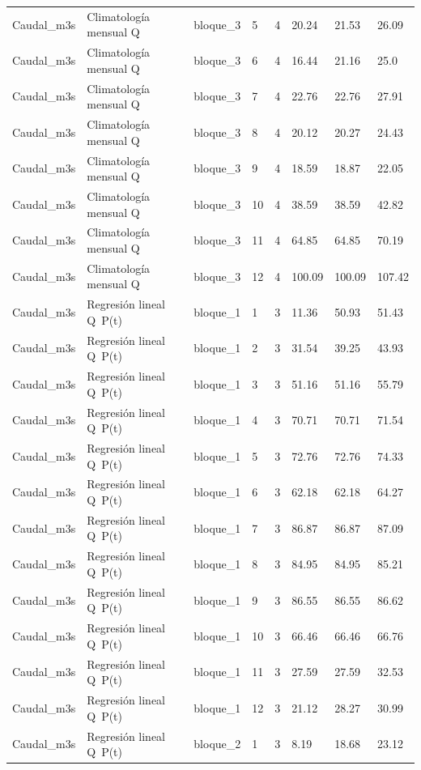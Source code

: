 \begin{longtable}{llllllll}
Caudal\_m3s & Climatología mensual Q & bloque\_3 & 5 & 4 & 20.24 & 21.53 & 26.09 \\
Caudal\_m3s & Climatología mensual Q & bloque\_3 & 6 & 4 & 16.44 & 21.16 & 25.0 \\
Caudal\_m3s & Climatología mensual Q & bloque\_3 & 7 & 4 & 22.76 & 22.76 & 27.91 \\
Caudal\_m3s & Climatología mensual Q & bloque\_3 & 8 & 4 & 20.12 & 20.27 & 24.43 \\
Caudal\_m3s & Climatología mensual Q & bloque\_3 & 9 & 4 & 18.59 & 18.87 & 22.05 \\
Caudal\_m3s & Climatología mensual Q & bloque\_3 & 10 & 4 & 38.59 & 38.59 & 42.82 \\
Caudal\_m3s & Climatología mensual Q & bloque\_3 & 11 & 4 & 64.85 & 64.85 & 70.19 \\
Caudal\_m3s & Climatología mensual Q & bloque\_3 & 12 & 4 & 100.09 & 100.09 & 107.42 \\
Caudal\_m3s & Regresión lineal Q~P(t) & bloque\_1 & 1 & 3 & 11.36 & 50.93 & 51.43 \\
Caudal\_m3s & Regresión lineal Q~P(t) & bloque\_1 & 2 & 3 & 31.54 & 39.25 & 43.93 \\
Caudal\_m3s & Regresión lineal Q~P(t) & bloque\_1 & 3 & 3 & 51.16 & 51.16 & 55.79 \\
Caudal\_m3s & Regresión lineal Q~P(t) & bloque\_1 & 4 & 3 & 70.71 & 70.71 & 71.54 \\
Caudal\_m3s & Regresión lineal Q~P(t) & bloque\_1 & 5 & 3 & 72.76 & 72.76 & 74.33 \\
Caudal\_m3s & Regresión lineal Q~P(t) & bloque\_1 & 6 & 3 & 62.18 & 62.18 & 64.27 \\
Caudal\_m3s & Regresión lineal Q~P(t) & bloque\_1 & 7 & 3 & 86.87 & 86.87 & 87.09 \\
Caudal\_m3s & Regresión lineal Q~P(t) & bloque\_1 & 8 & 3 & 84.95 & 84.95 & 85.21 \\
Caudal\_m3s & Regresión lineal Q~P(t) & bloque\_1 & 9 & 3 & 86.55 & 86.55 & 86.62 \\
Caudal\_m3s & Regresión lineal Q~P(t) & bloque\_1 & 10 & 3 & 66.46 & 66.46 & 66.76 \\
Caudal\_m3s & Regresión lineal Q~P(t) & bloque\_1 & 11 & 3 & 27.59 & 27.59 & 32.53 \\
Caudal\_m3s & Regresión lineal Q~P(t) & bloque\_1 & 12 & 3 & 21.12 & 28.27 & 30.99 \\
Caudal\_m3s & Regresión lineal Q~P(t) & bloque\_2 & 1 & 3 & 8.19 & 18.68 & 23.12 \\

\end{longtable}
